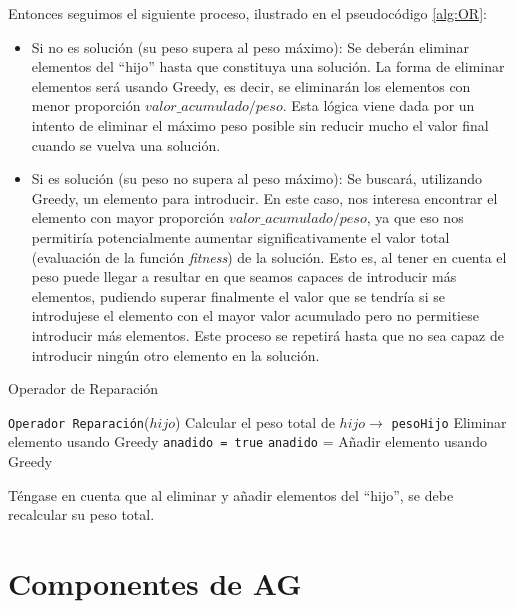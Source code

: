 Entonces seguimos el siguiente proceso, ilustrado en el pseudocódigo \ref{alg:OR}:
\begin{itemize}
	\item Si no es solución (su peso supera al peso máximo): Se deberán eliminar elementos del ``hijo'' hasta que constituya una solución. 
La forma de eliminar elementos será usando Greedy, es decir, se eliminarán los elementos con menor proporción $valor\_acumulado/peso$. 
Esta lógica viene dada por un intento de eliminar el máximo peso posible sin reducir mucho el valor final cuando se vuelva una solución. 
	
	\item Si es solución (su peso no supera al peso máximo): Se buscará, utilizando Greedy, un elemento para introducir. 
En este caso, nos interesa encontrar el elemento con mayor proporción $valor\_acumulado/peso$, ya que eso nos permitiría potencialmente aumentar significativamente el valor total (evaluación de la función \textit{fitness}) de la solución. 
Esto es, al tener en cuenta el peso puede llegar a resultar en que seamos capaces de introducir más elementos, pudiendo superar finalmente el valor que se tendría si se introdujese el elemento con el mayor valor acumulado pero no permitiese introducir más elementos. 
Este proceso se repetirá hasta que no sea capaz de introducir ningún otro elemento en la solución. 
\end{itemize}


\begin{algorithm}[H]
\caption{Operador de Reparación}\label{alg:OR}
\begin{algorithmic}[1]
\Procedure \texttt{Operador Reparación}($hijo$)
\State Calcular el peso total de $hijo \xrightarrow{}{}$ \texttt{pesoHijo}
		\State Eliminar elemento usando Greedy
	\EndWhile
\Else
	\State \texttt{anadido = true} 
		\State \texttt{anadido} = Añadir elemento usando Greedy
	\EndWhile
\EndIf
\EndProcedure
\end{algorithmic}
\end{algorithm}

Téngase en cuenta que al eliminar y añadir elementos del ``hijo'', se debe recalcular su peso total.


\section{Componentes de AG}

